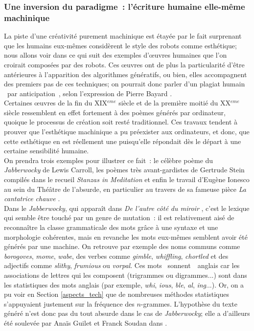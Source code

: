 \documentclass{article}
\begin{document}
			\subsubsection{Une inversion du paradigme~: l'écriture humaine elle-même machinique} \label{inversion_paradigme}
				La piste d'une créativité purement machinique est étayée par le fait surprenant que les humains eux-mêmes considèrent le style des robots comme esthétique; nous allons voir dans ce qui suit des exemples d'œuvres humaines que l'on croirait composées par des robots. Ces œuvres ont de plus la particularité d'être antérieures à l'apparition des algorithmes génératifs, ou bien, elles accompagnent des premiers pas de ces techniques; on pourrait donc parler d'un plagiat humain \guillemotleft~par anticipation~\guillemotright, selon l'expression de Pierre Bayard \autocite{bayard2002}.\\
				
				Certaines œuvres de la fin du XIX$^{eme}$ siècle et de la première moitié du XX$^{eme}$ siècle ressemblent en effet fortement à des poèmes générés par ordinateur, quoique le processus de création soit resté traditionnel. Ces travaux tendent à prouver que l'esthétique machinique a pu préexister aux ordinateurs, et donc, que cette esthétique en est réellement une puisqu'elle répondait dès le départ à une certaine sensibilité humaine.\\
				On prendra trois exemples pour illustrer ce fait~: le célèbre poème du \textit{Jabberwocky} de Lewis Carroll, les poèmes très avant-gardistes de Gertrude Stein compilés dans le recueil \textit{Stanzas in Meditation} \autocite{stein1932} et enfin le travail d'Eugène Ionesco au sein du Théâtre de l'absurde, en particulier au travers de sa fameuse pièce \textit{La cantatrice chauve} \autocite{ionesco1950}.\\
				
				Dans le \textit{Jabberwocky}, qui apparaît dans \textit{De l'autre côté du miroir} \autocite{carroll1871}, c'est le lexique qui semble être touché par un genre de mutation~: il est relativement aisé de reconnaître la classe grammaticale des mots grâce à une syntaxe et une morphologie cohérentes, mais en revanche les mots eux-mêmes semblent avoir été générés par une machine. On retrouve par exemple des noms communs comme \textit{borogoves}, \textit{mome}, \textit{wabe}, des verbes comme \textit{gimble}, \textit{whiffling}, \textit{chortled} et des adjectifs comme \textit{slithy}, \textit{frumious} ou \textit{vorpal}. Ces mots \guillemotleft~sonnent~\guillemotright~anglais car les associations de lettres qui les composent (trigrammes ou digrammes...) sont dans les statistiques des mots anglais (par exemple, \textit{whi}, \textit{ious}, \textit{ble}, \textit{al}, \textit{ing}...). Or, on a pu voir en Section \ref{aspects_tech} que de nombreuses méthodes statistiques s'appuyaient justement sur la fréquence des $n$-grammes. L'hypothèse du texte généré n'est donc pas du tout absurde dans le cas de \textit{Jabberwocky}; elle a d'ailleurs été soulevée par Anaïs Guilet et Franck Soudan dans \autocite{guilet2017}.\\
				
\end{document}
